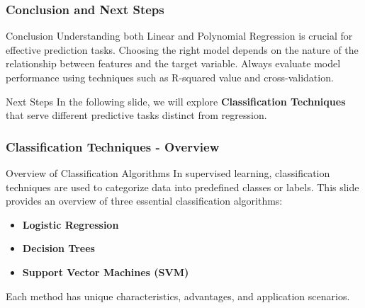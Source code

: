\documentclass[aspectratio=169]{beamer}
\begin{document}
\begin{frame}[fragile]
    \frametitle{Conclusion and Next Steps}
    \begin{block}{Conclusion}
        Understanding both Linear and Polynomial Regression is crucial for effective prediction tasks. Choosing the right model depends on the nature of the relationship between features and the target variable. 
        Always evaluate model performance using techniques such as R-squared value and cross-validation.
    \end{block}

    \begin{block}{Next Steps}
        In the following slide, we will explore \textbf{Classification Techniques} that serve different predictive tasks distinct from regression.
    \end{block}
\end{frame}

\begin{frame}[fragile]
    \frametitle{Classification Techniques - Overview}
    \begin{block}{Overview of Classification Algorithms}
        In supervised learning, classification techniques are used to categorize data into predefined classes or labels. This slide provides an overview of three essential classification algorithms:
        \begin{itemize}
            \item \textbf{Logistic Regression}
            \item \textbf{Decision Trees}
            \item \textbf{Support Vector Machines (SVM)}
        \end{itemize}
        Each method has unique characteristics, advantages, and application scenarios.
    \end{block}
\end{frame}
\end{document}
